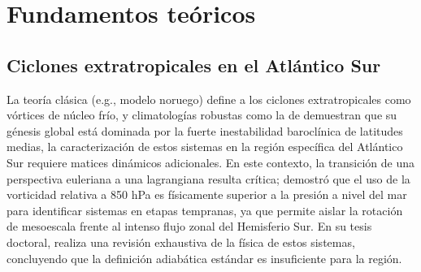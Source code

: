 \chapter{Fundamentos teóricos}\label{ch:theoretical_background}

\section{Ciclones extratropicales en el Atlántico Sur}\label{sec:tb_fundamentos}

La teoría clásica (e.g., modelo noruego) define a los ciclones extratropicales como vórtices de núcleo frío, y climatologías robustas como la de \citet{hoskins2005new} demuestran que su génesis global está dominada por la fuerte inestabilidad baroclínica de latitudes medias, la caracterización de estos sistemas en la región específica del Atlántico Sur requiere matices dinámicos adicionales. En este contexto, la transición de una perspectiva euleriana a una lagrangiana resulta crítica; \citet{sinclair1994objective} demostró que el uso de la vorticidad relativa a 850 hPa es físicamente superior a la presión a nivel del mar para identificar sistemas en etapas tempranas, ya que permite aislar la rotación de mesoescala frente al intenso flujo zonal del Hemisferio Sur.
%
En su tesis doctoral, \citet{coutodesouza2024thesis} realiza una revisión exhaustiva de la física de estos sistemas, concluyendo que la definición adiabática estándar es insuficiente para la región.

